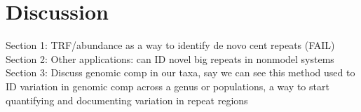 \documentclass[10pt,letterpaper]{article}
\newcommand{\lorem}{{\bf LOREM}}
\newcommand{\ipsum}{{\bf IPSUM}}
\begin{document}






\section*{Discussion}
Section 1: TRF/abundance as a way to identify de novo cent repeats (FAIL)
Section 2: Other applications: can ID novel big repeats in nonmodel systems
Section 3: Discuss genomic comp in our taxa, say we can see this method used to ID variation in genomic comp across a genus or populations, a way to start quantifying and documenting variation in repeat regions
\end{document}
